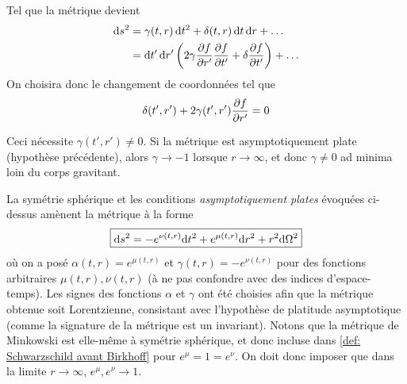 Tel que la métrique devient 
\begin{align}
    \mathrm{d} s^2 &= \gamma (t,r) \,\mathrm{d} t^2 + \delta (t,r) \, \mathrm{d} t \, \mathrm{d} r + \dots\\
    &= \mathrm{d} t' \, \mathrm{d} r' \left( 2 \gamma \frac{\partial f}{\partial r'} \frac{\partial f}{\partial t'} + \delta \frac{\partial f}{\partial t'}  \right) + \dots
\end{align}
On choisira donc le changement de coordonnées tel que 
\begin{equation}
    \delta (t',r') + 2 \gamma (t',r') \frac{\partial f}{\partial r'} = 0
\end{equation}
\begin{rmk}
    Ceci nécessite $\gamma(t',r') \neq 0$. Si la métrique est asymptotiquement plate (hypothèse précédente), alors $\gamma \to -1$ lorsque $r\to \infty$, et donc $\gamma \neq 0$ ad minima loin du corps gravitant.
\end{rmk}
La symétrie sphérique et les conditions \emph{asymptotiquement plates} évoquées ci-dessus amènent la métrique à la forme
\begin{equation}
\label{def: Schwarzschild avant Birkhoff}
    \boxed{\mathrm{d} s^2 = - e^{\nu(t,r)} \mathrm{d} t^2 + e^{\mu(t,r)} \mathrm{d} r^2 + r^2 \mathrm{d} \Omega^2}
\end{equation}
où on a posé $\alpha(t,r) = e^{\mu (t,r)}$ et $\gamma (t,r) = - e^{\nu (t,r)}$ pour des fonctions arbitraires $\mu (t,r), \nu (t,r)$ (à ne pas confondre avec des indices d'espace-temps). Les signes des fonctions $\alpha$ et $\gamma$ ont été choisies afin que la métrique obtenue soit Lorentzienne, consistant avec l'hypothèse de platitude asymptotique (comme la signature de la métrique est un invariant). Notons que la métrique de Minkowski est elle-même à symétrie sphérique, et donc incluse dans \ref{def: Schwarzschild avant Birkhoff} pour $e^\mu = 1 = e^\nu$. On doit donc imposer que dans la limite $r \to \infty$, $e^\mu, e^\nu \to 1$.
